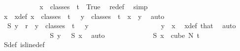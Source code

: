 \begin{isabellebody}
\isanewline
\ \ \ \ \ \ \ \ \isamarkupfalse%
\ \isamarkupfalse%
\ {\isachardoublequoteopen}{\isasymexists}{\isacharbang}{\kern0pt}x\ {\isasymin}\ classes\ {}\ t\ {}{\isachardot}{\kern0pt}\ True{\isachardoublequoteclose}\ \isamarkupfalse%
\ redef\ \isamarkupfalse%
\ simp\isanewline
\ \ \ \ \ \ \ \ \isamarkupfalse%
\ \isamarkupfalse%
\ x\ \ x{\isacharunderscore}{\kern0pt}def{\isacharcolon}{\kern0pt}\ {\isachardoublequoteopen}x\ {\isasymin}\ classes\ {}\ t\ {}\ {\isasymand}\ {\isacharparenleft}{\kern0pt}{\isasymforall}y\ {\isasymin}\ classes\ {}\ t\ {}{\isachardot}{\kern0pt}\ x\ {\isacharequal}{\kern0pt}\ y{\isacharparenright}{\kern0pt}{\isachardoublequoteclose}\ \isamarkupfalse%
\ auto\isanewline
\isanewline
\ \ \ \ \ \ \ \ \isamarkupfalse%
\ {\isachardoublequoteopen}{\isasymchi}\ {\isacharparenleft}{\kern0pt}S{}\ y{\isacharparenright}{\kern0pt}\ {\isacharless}{\kern0pt}\ r{\isachardoublequoteclose}\ \ {\isachardoublequoteopen}y\ {\isasymin}\ classes\ {}\ t\ {}{\isachardoublequoteclose}\ \ y\isanewline
\ \ \ \ \ \ \ \ \isamarkupfalse%
{\isacharminus}{\kern0pt}\isanewline
\ \ \ \ \ \ \ \ \ \ \isamarkupfalse%
\ {\isachardoublequoteopen}y\ {\isacharequal}{\kern0pt}\ x{\isachardoublequoteclose}\ \isamarkupfalse%
\ x{\isacharunderscore}{\kern0pt}def\ that\ \isamarkupfalse%
\ auto\isanewline
\ \ \ \ \ \ \ \ \ \ \isamarkupfalse%
\ \isamarkupfalse%
\ {\isachardoublequoteopen}{\isasymchi}\ {\isacharparenleft}{\kern0pt}S{}\ y{\isacharparenright}{\kern0pt}\ {\isacharequal}{\kern0pt}\ {\isasymchi}\ {\isacharparenleft}{\kern0pt}S{}\ x{\isacharparenright}{\kern0pt}{\isachardoublequoteclose}\ \isamarkupfalse%
\ auto\isanewline
\ \ \ \ \ \ \ \ \ \ \isamarkupfalse%
\ \isamarkupfalse%
\ {\isachardoublequoteopen}S{}\ x\ {\isasymin}\ cube\ N{\isacharprime}{\kern0pt}\ {\isacharparenleft}{\kern0pt}t{\isacharplus}{\kern0pt}{}{\isacharparenright}{\kern0pt}{\isachardoublequoteclose}\ \isamarkupfalse%
\ S{}{\isacharunderscore}{\kern0pt}def\ is{\isacharunderscore}{\kern0pt}line{\isacharunderscore}{\kern0pt}def\ \isanewline
\ \ \ \ \ \ \ \ \ \ \ \ \isamarkupfalse%

\end{isabellebody}
